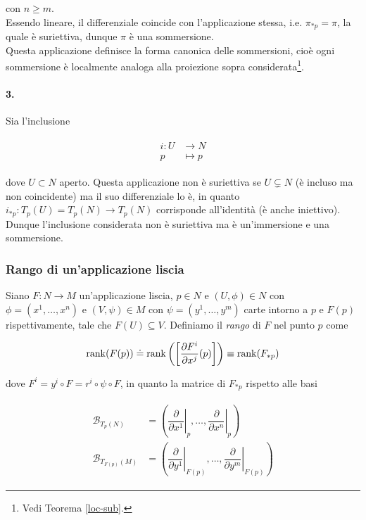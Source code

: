 con $ n \geqslant m $.\\
Essendo lineare, il differenziale coincide con l'applicazione stessa, i.e. $ \pi_{*p} = \pi $, la quale è suriettiva, dunque $ \pi $ è una sommersione.\\
Questa applicazione definisce la forma canonica delle sommersioni, cioè ogni sommersione è localmente analoga alla proiezione sopra considerata\footnote{%
	Vedi Teorema \ref{loc-sub}.%
}.

\paragraph{3.}

Sia l'inclusione

\begin{align}
	\begin{split}
		i : U &\to N\\
		p &\mapsto p
	\end{split}
\end{align}

dove $ U \subset N $ aperto. Questa applicazione non è suriettiva se $ U \subsetneq N $ (è incluso ma non coincidente) ma il suo differenziale lo è, in quanto $ i_{*p} : T_{p}(U) = T_{p}(N) \to T_{p}(N) $ corrisponde all'identità (è anche iniettivo).\\
Dunque l'inclusione considerata non è suriettiva ma è un'immersione e una sommersione.

\subsubsection{Rango di un'applicazione liscia}

Siano $ F : N \to M $ un'applicazione liscia, $ p \in N $ e $ (U,\phi) \in N $ con $ \phi = (x^{1},\dots,x^{n}) $ e $ (V,\psi) \in M $ con $ \psi = (y^{1},\dots,y^{m}) $ carte intorno a $ p $ e $ F(p) $ rispettivamente, tale che $ F(U) \subseteq V $. Definiamo il \textit{rango} di $ F $ nel punto $ p $ come

\begin{equation}
	\rank(F(p)) \doteq \rank\left( \left[ \dfrac{\partial F^{i}}{\partial x^{j}} (p) \right] \right) \equiv \rank(F_{*p})
\end{equation}

dove $ F^{i} = y^{i} \circ F = r^{i} \circ \psi \circ F $, in quanto la matrice di $ F_{*p} $ rispetto alle basi

\begin{align}
	\begin{split}
		\mathcal{B}_{T_{p}(N)} &= \left( \left. \dfrac{\partial}{\partial x^{1}} \right|_{p} , \dots , \left. \dfrac{\partial}{\partial x^{n}} \right|_{p} \right)\\
		\mathcal{B}_{T_{F(p)}(M)} &= \left( \left. \dfrac{\partial}{\partial y^{1}} \right|_{F(p)} , \dots , \left. \dfrac{\partial}{\partial y^{m}} \right|_{F(p)} \right)
	\end{split}
\end{align}

